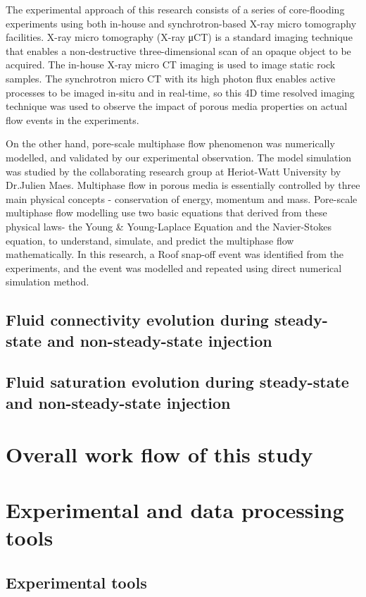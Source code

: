 The experimental approach of this research consists of a series of core-flooding experiments using both in-house and synchrotron-based X-ray micro tomography facilities. X-ray micro tomography (X-ray μCT) is a standard imaging technique that enables a non-destructive three-dimensional scan of an opaque object to be acquired. The in-house X-ray micro CT imaging is used to image static rock samples. The synchrotron micro CT with its high photon flux enables active processes to be imaged in-situ and in real-time, so this 4D time resolved imaging technique was used to observe the impact of porous media properties on actual flow events in the experiments.

On the other hand, pore-scale multiphase flow phenomenon was numerically modelled, and validated by our experimental observation. The model simulation was studied by the collaborating research group at Heriot-Watt University by Dr.Julien Maes. Multiphase flow in porous media is essentially controlled by three main physical concepts - conservation of energy, momentum and mass. Pore-scale multiphase flow modelling use two basic equations that derived from these physical laws- the Young & Young-Laplace Equation and the Navier-Stokes equation, to understand, simulate, and predict the multiphase flow mathematically. In this research, a Roof snap-off event was identified from the experiments, and the event was modelled and repeated using direct numerical simulation method.


\subsection{Fluid connectivity evolution during steady-state and non-steady-state injection}
\subsection{Fluid saturation evolution during steady-state and non-steady-state injection}

\section{Overall work flow of this study}

\section{Experimental and data processing tools}
\subsection{Experimental tools}

